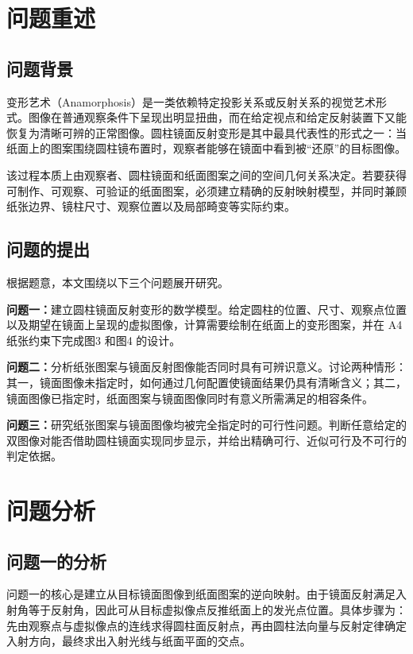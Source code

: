 \documentclass[a4paper,12pt]{ctexart}
\begin{document}
\newpage
\tableofcontents
\newpage

\section{问题重述}

\subsection{问题背景}
\par 变形艺术（Anamorphosis）是一类依赖特定投影关系或反射关系的视觉艺术形式。图像在普通观察条件下呈现出明显扭曲，而在给定视点和给定反射装置下又能恢复为清晰可辨的正常图像。圆柱镜面反射变形是其中最具代表性的形式之一：当纸面上的图案围绕圆柱镜布置时，观察者能够在镜面中看到被“还原”的目标图像。

\par 该过程本质上由观察者、圆柱镜面和纸面图案之间的空间几何关系决定。若要获得可制作、可观察、可验证的纸面图案，必须建立精确的反射映射模型，并同时兼顾纸张边界、镜柱尺寸、观察位置以及局部畸变等实际约束。

\subsection{问题的提出}
\par 根据题意，本文围绕以下三个问题展开研究。

\par \textbf{问题一：}建立圆柱镜面反射变形的数学模型。给定圆柱的位置、尺寸、观察点位置以及期望在镜面上呈现的虚拟图像，计算需要绘制在纸面上的变形图案，并在 A4 纸张约束下完成图3 和图4 的设计。

\par \textbf{问题二：}分析纸张图案与镜面反射图像能否同时具有可辨识意义。讨论两种情形：其一，镜面图像未指定时，如何通过几何配置使镜面结果仍具有清晰含义；其二，镜面图像已指定时，纸面图案与镜面图像同时有意义所需满足的相容条件。

\par \textbf{问题三：}研究纸张图案与镜面图像均被完全指定时的可行性问题。判断任意给定的双图像对能否借助圆柱镜面实现同步显示，并给出精确可行、近似可行及不可行的判定依据。

\section{问题分析}

\subsection{问题一的分析}
\par 问题一的核心是建立从目标镜面图像到纸面图案的逆向映射。由于镜面反射满足入射角等于反射角，因此可从目标虚拟像点反推纸面上的发光点位置。具体步骤为：先由观察点与虚拟像点的连线求得圆柱面反射点，再由圆柱法向量与反射定律确定入射方向，最终求出入射光线与纸面平面的交点。
\end{document}
